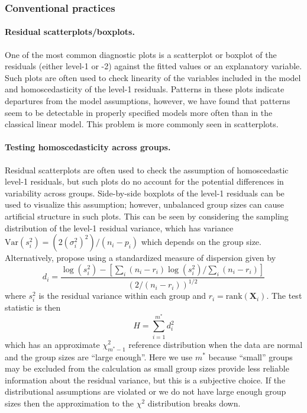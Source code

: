 \documentclass{article} %
\newcommand{\var}{\ensuremath{\mathrm{Var}}}
\begin{document}
\subsubsection{Conventional practices}

\paragraph{Residual scatterplots/boxplots.} 
One of the most common diagnostic plots is a scatterplot or boxplot of the residuals (either level-1 or -2) against the fitted values or an explanatory variable. Such plots are often used to check linearity of the variables included in the model and homoscedasticity of the level-1 residuals. Patterns in these plots indicate departures from the model assumptions, however, we have found that patterns seem to be detectable in properly specified models more often than in the classical linear model. This problem is more commonly seen in scatterplots. 

\paragraph{Testing homoscedasticity across groups.}
Residual scatterplots are often used to check the assumption of homoscedastic level-1 residuals, but such plots do no account for the potential differences in variability across groups. Side-by-side boxplots of the level-1 residuals can be used to visualize this assumption; however, unbalanced group sizes can cause artificial structure in such plots. This can be seen by considering the sampling distribution of the level-1 residual variance, which has variance $\var \left( s_i^2 \right) = \left(2 \left( \sigma_i^2 \right)^2 \right) \big/ (n_i - p_i)$ which depends on the group size. Alternatively, \cite{Raudenbush:2002} propose using a standardized measure of dispersion given by
%
\begin{equation}\label{eq:d}
	d_i = \frac{\log\left( s_i^2 \right) - \left[ \sum_i (n_i - r_i) \log\left( s_i^2 \right) / \sum_i  (n_i - r_i) \right]}{\left(2 / (n_i - r_i)\right)^{1/2}}
\end{equation}
%
where $s_i^2$ is the residual variance within each group and $r_i = \mathrm{rank}(\bm{X}_i)$. The test statistic is then
%
\begin{equation}
	H = \sum_{i=1}^{m^*} d_i^2
\end{equation}
%
which has an approximate $\chi^2_{m^*-1}$ reference distribution when the data are normal and the group sizes are ``large enough''. Here we use $m^*$ because ``small'' groups may be excluded from the calculation as small group sizes provide less reliable information about the residual variance, but this is a subjective choice. If the distributional assumptions are violated or we do not have large enough group sizes then the approximation to the $\chi^2$ distribution breaks down.
\end{document}
